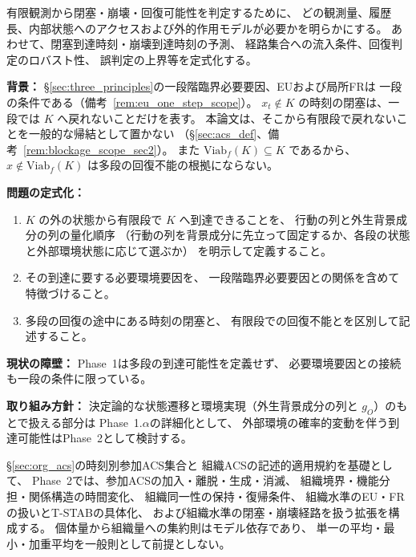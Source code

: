 \begin{problem}[閉塞・崩壊・回復の観測可能性]
\label{prob:collapse_observability}
有限観測から閉塞・崩壊・回復可能性を判定するために、
どの観測量、履歴長、内部状態へのアクセスおよび外的作用モデルが必要かを明らかにする。
あわせて、閉塞到達時刻・崩壊到達時刻の予測、
経路集合への流入条件、回復判定のロバスト性、
誤判定の上界等を定式化する。
\end{problem}

\begin{problem}[$K$ への多段の回復可能性と必要環境要因]
\label{prob:multistep_recovery}
\textbf{背景：}
\S\ref{sec:three_principles}の一段階臨界必要要因、EUおよび局所FRは
一段の条件である（備考~\ref{rem:eu_one_step_scope}）。
$x_t\notin K$ の時刻の閉塞は、一段では $K$ へ戻れないことだけを表す。
本論文は、そこから有限段で戻れないことを一般的な帰結として置かない
（\S\ref{sec:acs_def}、備考~\ref{rem:blockage_scope_sec2}）。
また $\mathrm{Viab}_f(K)\subseteq K$ であるから、
$x\notin\mathrm{Viab}_f(K)$ は多段の回復不能の根拠にならない。

\textbf{問題の定式化：}
\begin{enumerate}
  \item[(i)] $K$ の外の状態から有限段で $K$ へ到達できることを、
  行動の列と外生背景成分の列の量化順序
  （行動の列を背景成分に先立って固定するか、各段の状態と外部環境状態に応じて選ぶか）
  を明示して定義すること。
  \item[(ii)] その到達に要する必要環境要因を、
  一段階臨界必要要因との関係を含めて特徴づけること。
  \item[(iii)] 多段の回復の途中にある時刻の閉塞と、
  有限段での回復不能とを区別して記述すること。
\end{enumerate}

\textbf{現状の障壁：}
Phase~1は多段の到達可能性を定義せず、
必要環境要因との接続も一段の条件に限っている。

\textbf{取り組み方針：}
決定論的な状態遷移と環境実現（外生背景成分の列と $g_O$）のもとで扱える部分は
Phase~1.$\alpha$の詳細化として、
外部環境の確率的変動を伴う到達可能性はPhase~2として検討する。
\end{problem}

\begin{problem}
\label{prob:social_dynamics}
\S\ref{sec:org_acs}の時刻別参加ACS集合と
組織ACSの記述的適用規約を基礎として、
Phase~2では、参加ACSの加入・離脱・生成・消滅、
組織境界・機能分担・関係構造の時間変化、
組織同一性の保持・復帰条件、
組織水準のEU・FRの扱いとT-STABの具体化、
および組織水準の閉塞・崩壊経路を扱う拡張を構成する。
個体量から組織量への集約則はモデル依存であり、
単一の平均・最小・加重平均を一般則として前提としない。
\end{problem}

